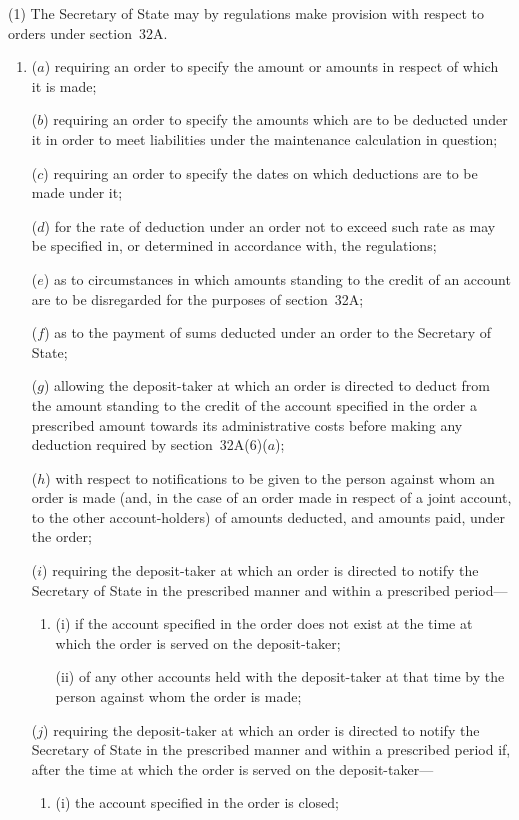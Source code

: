 \documentclass[12pt,a4paper]{article}
\begin{document}
(1) The Secretary of State may by regulations make provision with respect
to orders under section~32A.

\begin{enumerate}\item[]
($a$) requiring an order to specify the amount or amounts in respect of which it is made;

($b$) requiring an order to specify the amounts which are to be deducted under it
in order to meet liabilities under the maintenance calculation in question;

($c$) requiring an order to specify the dates on which deductions are to be made
under it;

($d$) for the rate of deduction under an order not to exceed such rate as may be
specified in, or determined in accordance with, the regulations;

($e$) as to circumstances in which amounts standing to the credit of an account
are to be disregarded for the purposes of section~32A;

($f$) as to the payment of sums deducted under an order to the Secretary of
State;

($g$) allowing the deposit-taker at which an order is directed to deduct from the
amount standing to the credit of the account specified in the order a prescribed
amount towards its administrative costs before making any deduction required
by section~32A(6)($a$);

($h$) with respect to notifications to be given to the person against whom an order
is made (and, in the case of an order made in respect of a joint account, to the
other account-holders) of amounts deducted, and amounts paid, under the
order;

($i$) requiring the deposit-taker at which an order is directed to notify the
Secretary of State  %
in the prescribed manner and within a prescribed period---
\begin{enumerate}\item[]
(i)
if the account specified in the order does not exist at the time at which
the order is served on the deposit-taker;

(ii)
of any other accounts held with the deposit-taker at that time by the
person against whom the order is made;
\end{enumerate}

($j$) requiring the deposit-taker at which an order is directed to notify the 
Secretary of State  %
in the prescribed manner and within a prescribed period if, after the time at which the order is served on the deposit-taker---
\begin{enumerate}\item[]
(i) the account specified in the order is closed;


\end{enumerate}
\end{enumerate}
\end{document}
